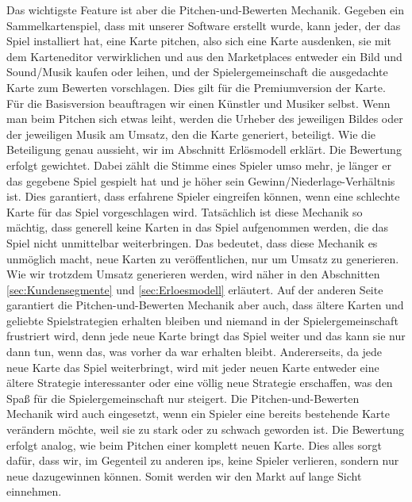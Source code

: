\documentclass[fontsize=11, a4aper]{scrartcl}
\begin{document}
\noindent Das wichtigste Feature ist aber die Pitchen-und-Bewerten Mechanik. Gegeben ein Sammelkartenspiel, dass mit unserer Software erstellt wurde, kann jeder, der das Spiel installiert hat, eine Karte pitchen, also sich eine Karte ausdenken, sie mit dem Karteneditor verwirklichen und aus den Marketplaces entweder ein Bild und Sound/Musik kaufen oder leihen, und der Spielergemeinschaft die ausgedachte Karte zum Bewerten vorschlagen. Dies gilt für die Premiumversion der Karte. Für die Basisversion beauftragen wir einen Künstler und Musiker selbst. Wenn man beim Pitchen sich etwas leiht, werden die Urheber des jeweiligen Bildes oder der jeweiligen Musik am Umsatz, den die Karte generiert, beteiligt. Wie die Beteiligung genau aussieht, wir im Abschnitt \glqq Erlösmodell\grqq{} erklärt. Die Bewertung erfolgt gewichtet. Dabei zählt die Stimme eines Spieler umso mehr, je länger er das gegebene Spiel gespielt hat und je höher sein Gewinn/Niederlage-Verhältnis ist. Dies garantiert, dass erfahrene Spieler eingreifen können, wenn eine schlechte Karte für das Spiel vorgeschlagen wird. Tatsächlich ist diese Mechanik so mächtig, dass generell keine Karten in das Spiel aufgenommen werden, die das Spiel nicht unmittelbar weiterbringen. Das bedeutet, dass diese Mechanik es unmöglich macht, neue Karten zu veröffentlichen, nur um Umsatz zu generieren. Wie wir trotzdem Umsatz generieren werden, wird näher in den Abschnitten \ref{sec:Kundensegmente} und \ref{sec:Erloesmodell} erläutert. Auf der anderen Seite garantiert die Pitchen-und-Bewerten Mechanik aber auch, dass ältere Karten und geliebte Spielstrategien erhalten bleiben und niemand in der Spielergemeinschaft frustriert wird, denn jede neue Karte bringt das Spiel weiter und das kann sie nur dann tun, wenn das, was vorher da war erhalten bleibt. Andererseits, da jede neue Karte das Spiel weiterbringt, wird mit jeder neuen Karte entweder eine ältere Strategie interessanter oder eine völlig neue Strategie erschaffen, was den Spaß für die Spielergemeinschaft nur steigert. Die Pitchen-und-Bewerten Mechanik wird auch eingesetzt, wenn ein Spieler eine bereits bestehende Karte verändern möchte, weil sie zu stark oder zu schwach geworden ist. Die Bewertung erfolgt analog, wie beim Pitchen einer komplett neuen Karte. Dies alles sorgt dafür, dass wir, im Gegenteil zu anderen \acp{ip}, keine Spieler verlieren, sondern nur neue dazugewinnen können. Somit werden wir den Markt auf lange Sicht einnehmen.\hfill\newline
\end{document}
